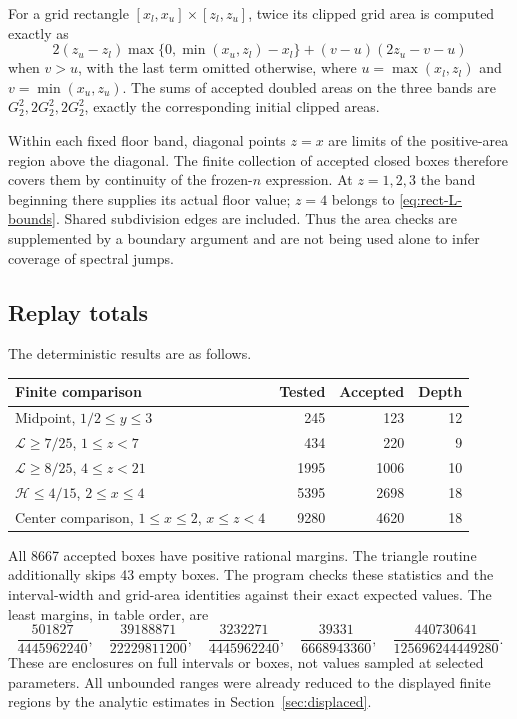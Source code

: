 \documentclass[11pt,reqno]{amsart}
\numberwithin{equation}{section}
\begin{document}
For a grid rectangle $[x_l,x_u]\times[z_l,z_u]$, twice its
clipped grid area is computed exactly as
\[
 2(z_u-z_l)\max\{0,\min(x_u,z_l)-x_l\}
 +(v-u)(2z_u-v-u)
\]
when $v>u$, with the last term omitted otherwise, where
$u=\max(x_l,z_l)$ and $v=\min(x_u,z_u)$.
The sums of accepted doubled areas on the three bands are
$G_2^2,2G_2^2,2G_2^2$, exactly the corresponding initial
clipped areas.

Within each fixed floor band, diagonal points $z=x$ are
limits of the positive-area region above the diagonal.
The finite collection of accepted closed boxes therefore
covers them by continuity of the frozen-$n$ expression.
At $z=1,2,3$ the band beginning there supplies its actual
floor value; $z=4$ belongs to \eqref{eq:rect-L-bounds}.
Shared subdivision edges are included. Thus the area checks
are supplemented by a boundary argument and are not being
used alone to infer coverage of spectral jumps.

\subsection*{Replay totals}

The deterministic results are as follows.
\begin{center}
\small
\begin{tabular}{@{}lrrr@{}}
\toprule
Finite comparison & Tested & Accepted & Depth\\
\midrule
Midpoint, $1/2\le y\le3$ & 245 & 123 & 12\\
$\mathcal L\ge7/25$, $1\le z<7$ & 434 & 220 & 9\\
$\mathcal L\ge8/25$, $4\le z<21$ & 1995 & 1006 & 10\\
$\mathcal H\le4/15$, $2\le x\le4$ & 5395 & 2698 & 18\\
Center comparison, $1\le x\le2$, $x\le z<4$ & 9280 & 4620 & 18\\
\bottomrule
\end{tabular}
\end{center}
All 8667 accepted boxes have positive rational margins.
The triangle routine additionally skips 43 empty boxes.
The program checks these statistics and the interval-width
and grid-area identities against their exact expected values.
The least margins, in table order, are
\[
 \frac{501827}{4445962240},\quad
 \frac{39188871}{22229811200},\quad
 \frac{3232271}{4445962240},\quad
 \frac{39331}{6668943360},\quad
 \frac{440730641}{125696244449280}.
\]
These are enclosures on full intervals or boxes, not values
sampled at selected parameters. All unbounded ranges were
already reduced to the displayed finite regions by the
analytic estimates in Section~\ref{sec:displaced}.
\end{document}
